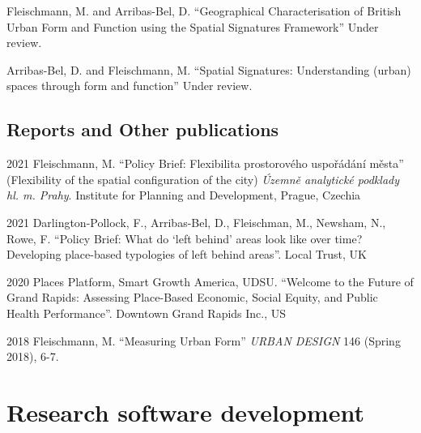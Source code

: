 \documentclass[12pt,a4paper]{report}
\begin{document}
    \begin{tablist}

        \item[\the\year] \tab{}Fleischmann, M. and Arribas-Bel, D. \enquote{Geographical Characterisation of British Urban Form and Function using the Spatial Signatures Framework} Under review.

        \item[\the\year] \tab{}Arribas-Bel, D. and Fleischmann, M. \enquote{Spatial Signatures: Understanding (urban) spaces through form and function} Under review.

    \end{tablist}

    \subsection*{Reports and Other publications}

    \begin{tablist}

        \item[2021] \tab{}Fleischmann, M. \enquote{Policy Brief: Flexibilita prostorového uspořádání města} (Flexibility of the spatial configuration of the city) \textit{Územně analytické podklady hl. m. Prahy}. Institute for Planning and Development, Prague, Czechia
        \item[2021] \tab{}Darlington-Pollock, F., Arribas-Bel, D., Fleischman, M., Newsham, N., Rowe, F. \enquote{Policy Brief: What do ‘left behind’ areas look like over time? Developing place-based typologies of left behind areas}. Local Trust, UK
        \item[2020] \tab{}Places Platform, Smart Growth America, UDSU. \enquote{Welcome to the Future of Grand Rapids: Assessing Place-Based Economic, Social Equity, and Public Health Performance}. Downtown Grand Rapids Inc., US
        \item[2018] \tab{}Fleischmann, M. \enquote{Measuring Urban Form} \textit{URBAN DESIGN} 146 (Spring 2018), 6-7.

    \end{tablist}

    \section*{Research software development}
\end{document}
